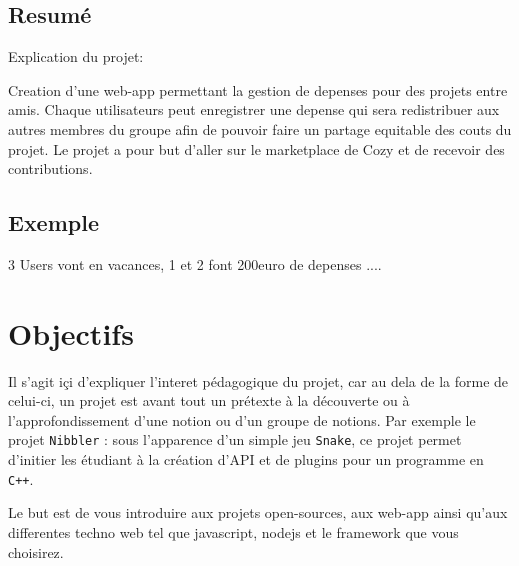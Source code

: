 \documentclass{42}
\begin{document}
    \section{Resum\'e}
        Explication du projet:\newline

        Creation d'une web-app permettant la gestion de depenses pour des projets
        entre amis. Chaque utilisateurs peut enregistrer une depense qui sera
        redistribuer aux autres membres du groupe afin de pouvoir faire un partage
        equitable des couts du projet. Le projet a pour but d'aller sur le
        marketplace de Cozy et de recevoir des contributions.

    \section{Exemple}
        3 Users vont en vacances, 1 et 2 font 200euro de depenses ....\newline


\chapter{Objectifs}

    Il s'agit i\c ci d'expliquer l'interet p\'edagogique du projet,
    car au dela de la forme de celui-ci, un projet est avant tout un
    pr\'etexte \`a la d\'ecouverte ou \`a l'approfondissement d'une
    notion ou d'un groupe de notions. Par exemple le projet
    \texttt{Nibbler} : sous l'apparence d'un simple jeu
    \texttt{Snake}, ce projet permet d'initier les \'etudiant \`a la
    cr\'eation d'API et de plugins pour un programme en \texttt{C++}.\newline


    Le but est de vous introduire aux projets open-sources, aux web-app ainsi
    qu'aux differentes techno web tel que javascript, nodejs et le framework que
    vous choisirez.


\end{document}
